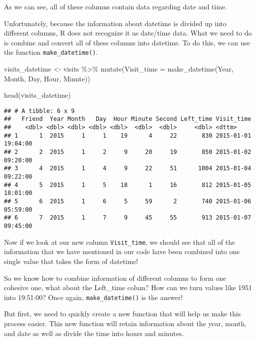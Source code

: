 \documentclass[
]{book}
\newenvironment{Shaded}{\begin{snugshade}}{\end{snugshade}}
\newcommand{\AttributeTok}[1]{\textcolor[rgb]{0.77,0.63,0.00}{#1}}
\newcommand{\FunctionTok}[1]{\textcolor[rgb]{0.00,0.00,0.00}{#1}}
\newcommand{\NormalTok}[1]{#1}
\newcommand{\OtherTok}[1]{\textcolor[rgb]{0.56,0.35,0.01}{#1}}
\newcommand{\SpecialCharTok}[1]{\textcolor[rgb]{0.00,0.00,0.00}{#1}}
\begin{document}
As we can see, all of these columns contain data regarding date and time.

Unfortunately, because the information about datetime is divided up into different columns, R does not recognize it as date/time data. What we need to do is combine and convert all of these columns into datetime. To do this, we can use the function \texttt{make\_datetime()}.

\begin{Shaded}
\begin{Highlighting}[]
\NormalTok{visits\_datetime }\OtherTok{\textless{}{-}}\NormalTok{ visits }\SpecialCharTok{\%\textgreater{}\%}
    \FunctionTok{mutate}\NormalTok{(}\AttributeTok{Visit\_time =} \FunctionTok{make\_datetime}\NormalTok{(Year, Month, Day, Hour, Minute))}
\end{Highlighting}
\end{Shaded}

\begin{Shaded}
\begin{Highlighting}[]
\FunctionTok{head}\NormalTok{(visits\_datetime)}
\end{Highlighting}
\end{Shaded}

\begin{verbatim}
## # A tibble: 6 x 9
##   Friend  Year Month   Day  Hour Minute Second Left_time Visit_time         
##    <dbl> <dbl> <dbl> <dbl> <dbl>  <dbl>  <dbl>     <dbl> <dttm>             
## 1      1  2015     1     1    19      4     22       830 2015-01-01 19:04:00
## 2      2  2015     1     2     9     20     19       850 2015-01-02 09:20:00
## 3      4  2015     1     4     9     22     51      1004 2015-01-04 09:22:00
## 4      5  2015     1     5    18      1     16       812 2015-01-05 18:01:00
## 5      6  2015     1     6     5     59      2       740 2015-01-06 05:59:00
## 6      7  2015     1     7     9     45     55       913 2015-01-07 09:45:00
\end{verbatim}

Now if we look at our new column \texttt{Visit\_time}, we should see that all of the information that we have mentioned in our code have been combined into one single value that takes the form of datetime!

So we know how to combine information of different columns to form one cohesive one, what about the Left\_time colum? How can we turn values like 1951 into 19:51:00? Once again, \texttt{make\_datetime()} is the answer!

But first, we need to quickly create a new function that will help us make this process easier. This new function will retain information about the year, month, and date as well as divide the time into hours and minutes.
\end{document}
